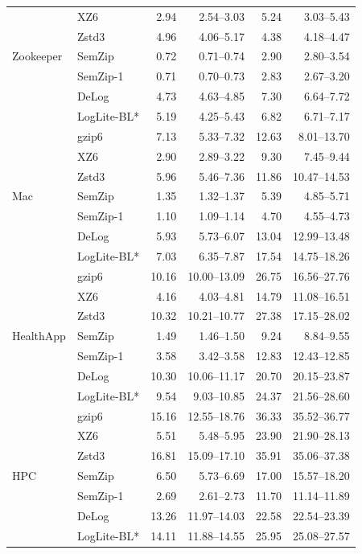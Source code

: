 \begin{longtable}{llrrrr}
 & XZ6 & 2.94 & 2.54--3.03 & 5.24 & 3.03--5.43 \\
 & Zstd3 & 4.96 & 4.06--5.17 & 4.38 & 4.18--4.47 \\
\midrule
Zookeeper & SemZip & 0.72 & 0.71--0.74 & 2.90 & 2.80--3.54 \\
 & SemZip-1 & 0.71 & 0.70--0.73 & 2.83 & 2.67--3.20 \\
 & DeLog & 4.73 & 4.63--4.85 & 7.30 & 6.64--7.72 \\
 & LogLite-BL* & 5.19 & 4.25--5.43 & 6.82 & 6.71--7.17 \\
 & gzip6 & 7.13 & 5.33--7.32 & 12.63 & 8.01--13.70 \\
 & XZ6 & 2.90 & 2.89--3.22 & 9.30 & 7.45--9.44 \\
 & Zstd3 & 5.96 & 5.46--7.36 & 11.86 & 10.47--14.53 \\
\midrule
Mac & SemZip & 1.35 & 1.32--1.37 & 5.39 & 4.85--5.71 \\
 & SemZip-1 & 1.10 & 1.09--1.14 & 4.70 & 4.55--4.73 \\
 & DeLog & 5.93 & 5.73--6.07 & 13.04 & 12.99--13.48 \\
 & LogLite-BL* & 7.03 & 6.35--7.87 & 17.54 & 14.75--18.26 \\
 & gzip6 & 10.16 & 10.00--13.09 & 26.75 & 16.56--27.76 \\
 & XZ6 & 4.16 & 4.03--4.81 & 14.79 & 11.08--16.51 \\
 & Zstd3 & 10.32 & 10.21--10.77 & 27.38 & 17.15--28.02 \\
\midrule
HealthApp & SemZip & 1.49 & 1.46--1.50 & 9.24 & 8.84--9.55 \\
 & SemZip-1 & 3.58 & 3.42--3.58 & 12.83 & 12.43--12.85 \\
 & DeLog & 10.30 & 10.06--11.17 & 20.70 & 20.15--23.87 \\
 & LogLite-BL* & 9.54 & 9.03--10.85 & 24.37 & 21.56--28.60 \\
 & gzip6 & 15.16 & 12.55--18.76 & 36.33 & 35.52--36.77 \\
 & XZ6 & 5.51 & 5.48--5.95 & 23.90 & 21.90--28.13 \\
 & Zstd3 & 16.81 & 15.09--17.10 & 35.91 & 35.06--37.38 \\
\midrule
HPC & SemZip & 6.50 & 5.73--6.69 & 17.00 & 15.57--18.20 \\
 & SemZip-1 & 2.69 & 2.61--2.73 & 11.70 & 11.14--11.89 \\
 & DeLog & 13.26 & 11.97--14.03 & 22.58 & 22.54--23.39 \\
 & LogLite-BL* & 14.11 & 11.88--14.55 & 25.95 & 25.08--27.57 \\

\end{longtable}
